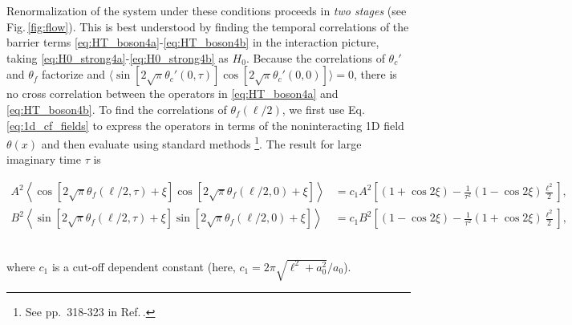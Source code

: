 \documentclass[aps,prb,reprint,floatfix,superscriptaddress,amssymb,amsmath]{revtex4-2}
\begin{document}
Renormalization of the system under these conditions proceeds in \emph{two stages} (see Fig.\,\ref{fig:flow}). This is best understood by finding
the temporal correlations of the barrier terms \eqref{eq:HT_boson4a}-\eqref{eq:HT_boson4b} in the interaction picture, taking \eqref{eq:H0_strong4a}-\eqref{eq:H0_strong4b} as $H_0$. Because the correlations of $\theta_c'$ and $\theta_f$ factorize and 
$\langle \sin[2\sqrt{\pi} \theta_c'(0,\tau)] \cos[2\sqrt{\pi} \theta_c'(0,0)] \rangle \!=\! 0$, there is no cross correlation between the operators in \eqref{eq:HT_boson4a} and \eqref{eq:HT_boson4b}. 
To find the correlations of $\theta_f(\ell/2)$, we first use Eq.\,\eqref{eq:1d_cf_fields} to express the operators in terms of the noninteracting 1D field $\theta(x)$ and then evaluate using standard methods 
\footnote{See pp.\ 318-323 in Ref.\,\cite{GiamarchiBook}.}. The result for large imaginary time $\tau$ is 
\begin{widetext}
\vspace*{-0.5cm}
\begin{subequations}
\begin{align}
A^2 \left\langle \cos\!\left[2\sqrt{\pi} \theta_f(\ell/2,\tau) + \xi\right] \cos\!\left[2\sqrt{\pi} \theta_f(\ell/2,0) + \xi \right]   \right\rangle 
 & = c_1 A^2 \left[ (1 + \cos 2\xi) - \frac{1}{\tau^2}  (1 - \cos 2\xi) \frac{\ell^2}{2} \right],
 \label{eq:ffield_corr1}\\
 B^2 \left\langle \sin\!\left[2\sqrt{\pi} \theta_f(\ell/2,\tau) + \xi\right] \sin\!\left[2\sqrt{\pi} \theta_f(\ell/2,0) + \xi \right]   \right\rangle 
 & = c_1 B^2 \left[ (1 - \cos 2\xi) - \frac{1}{\tau^2}  (1 + \cos 2\xi) \frac{\ell^2}{2} \right],
\label{eq:ffield_corr2}
\end{align}
\label{eq:ffield-corr}
\end{subequations}\vspace*{-0.5cm}\\
\end{widetext}
where $c_1$ is a cut-off dependent constant (here, $c_1 =  2\pi\sqrt{\ell^2 + a_0^2}/a_0$). 
\end{document}
